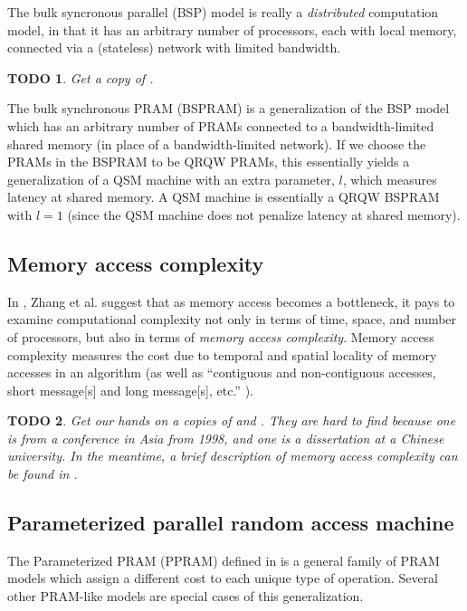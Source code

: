 \documentclass{article}
\newtheorem{todo}{TODO}
\begin{document}
The bulk syncronous parallel (BSP) \cite{valiant89} model is really a \emph{distributed} computation model, in that it has an arbitrary number of processors, each with local memory, connected via a (stateless) network with limited bandwidth.

\begin{todo}
  Get a copy of \cite{valiant89}.
\end{todo}

The bulk synchronous PRAM (BSPRAM) \cite{tiskin98} is a generalization of the BSP model which has an arbitrary number of PRAMs connected to a bandwidth-limited shared memory (in place of a bandwidth-limited network).
If we choose the PRAMs in the BSPRAM to be QRQW PRAMs, this essentially yields a generalization of a QSM machine with an extra parameter, $l$, which measures latency at shared memory.
A QSM machine is essentially a QRQW BSPRAM with $l=1$ (since the QSM machine does not penalize latency at shared memory).

\subsection{Memory access complexity}

In \cite{zstc98, zhang00}, Zhang et al. suggest that as memory access becomes a bottleneck, it pays to examine computational complexity not only in terms of time, space, and number of processors, but also in terms of \emph{memory access complexity}.
Memory access complexity measures the cost due to temporal and spatial locality of memory accesses in an algorithm (as well as ``contiguous and non-contiguous accesses, short message[s] and long message[s], etc.'' \cite{zcsm07}).

\begin{todo}
  Get our hands on a copies of \cite{zstc98} and \cite{zhang00}.
  They are hard to find because one is from a conference in Asia from 1998, and one is a dissertation at a Chinese university.
  In the meantime, a brief description of memory access complexity can be found in \cite[Section~4.3]{zcsm07}.
\end{todo}

\subsection{Parameterized parallel random access machine}

The Parameterized PRAM (PPRAM) defined in \cite{hc} is a general family of PRAM models which assign a different cost to each unique type of operation.
Several other PRAM-like models are special cases of this generalization.
\end{document}
